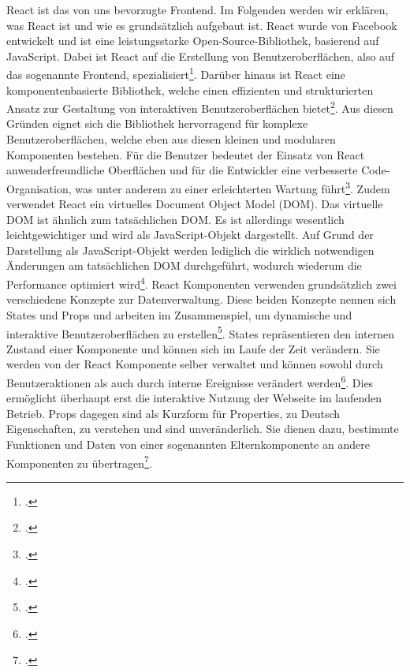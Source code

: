React ist das von uns bevorzugte Frontend. Im Folgenden werden wir erklären, was React ist und wie es grundsätzlich aufgebaut ist.
React wurde von Facebook entwickelt und ist eine leistungsstarke Open-Source-Bibliothek, basierend auf JavaScript. Dabei ist React auf die Erstellung von Benutzeroberflächen, also auf das sogenannte Frontend, spezialisiert\footcite{acharya_15_2023}. Darüber hinaus ist React eine komponentenbasierte Bibliothek, welche einen effizienten und strukturierten Ansatz zur Gestaltung von interaktiven Benutzeroberflächen bietet\footcite{p_was_2024}. 
Aus diesen Gründen eignet sich die Bibliothek hervorragend für komplexe Benutzeroberflächen, welche eben aus diesen kleinen und modularen Komponenten bestehen. Für die Benutzer bedeutet der Einsatz von React anwenderfreundliche Oberflächen und für die Entwickler eine verbesserte Code-Organisation, was unter anderem zu einer erleichterten Wartung führt\footcite{laurent_komponentenbasierte_2023}.
Zudem verwendet React ein virtuelles Document Object Model (DOM). Das virtuelle DOM ist ähnlich zum tatsächlichen DOM. Es ist allerdings wesentlich leichtgewichtiger und wird als JavaScript-Objekt dargestellt. Auf Grund der Darstellung als JavaScript-Objekt werden lediglich die wirklich notwendigen Änderungen am tatsächlichen DOM durchgeführt, wodurch wiederum die Performance optimiert wird\footcite{chauhan_mastering_2023}.
React Komponenten verwenden grundsätzlich zwei verschiedene Konzepte zur Datenverwaltung. Diese beiden Konzepte nennen sich States und Props und arbeiten im Zusammenspiel, um dynamische und interaktive Benutzeroberflächen zu erstellen\footcite{bhimani_react_2024}.
States repräsentieren den internen Zustand einer Komponente und können sich im Laufe der Zeit verändern. Sie werden von der React Komponente selber verwaltet und können sowohl durch Benutzeraktionen als auch durch interne Ereignisse verändert werden\footcite{nestorowicz_state_2021}. Dies ermöglicht überhaupt erst die interaktive Nutzung der Webseite im laufenden Betrieb.
Props dagegen sind als Kurzform für Properties, zu Deutsch Eigenschaften, zu verstehen und sind unveränderlich. Sie dienen dazu, bestimmte Funktionen und Daten von einer sogenannten Elternkomponente an andere Komponenten zu übertragen\footcite{platforms_state_nodate}.